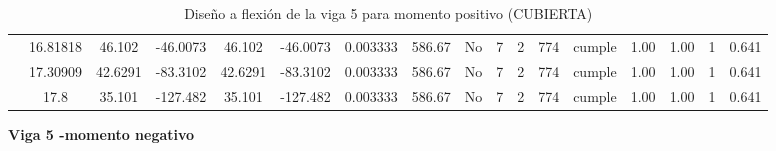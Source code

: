\begin{table}[H]
{\begin{tabular}{|c|c|c|c|c|c|c|c|c|c|c|c|c|c|c|c|c|}
\cline{2-17}    & 16.81818 & 46.102 & -46.0073 & 46.102 & -46.0073 & 0.003333 & 586.67 & No  & 7   & 2   & 774 & \cellcolor[rgb]{ .776,  .937,  .808}cumple & 1.00 & 1.00 & 1   & 0.641 \bigstrut\\
\cline{2-17}    & 17.30909 & 42.6291 & -83.3102 & 42.6291 & -83.3102 & 0.003333 & 586.67 & No  & 7   & 2   & 774 & \cellcolor[rgb]{ .776,  .937,  .808}cumple & 1.00 & 1.00 & 1   & 0.641 \bigstrut\\
\cline{2-17}    & 17.8 & 35.101 & -127.482 & 35.101 & -127.482 & 0.003333 & 586.67 & No  & 7   & 2   & 774 & \cellcolor[rgb]{ .776,  .937,  .808}cumple & 1.00 & 1.00 & 1   & 0.641 \bigstrut\\
\hline
\end{tabular}%


  }%
    \caption{Diseño a flexión de la viga 5 para momento positivo (CUBIERTA) }
  \label{tab:F VG5 CUB M+}%
\end{table}%
\newpage
\textbf{Viga 5 -momento negativo}
